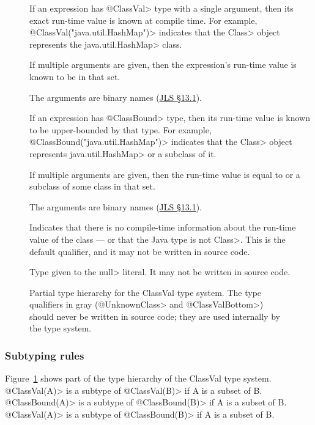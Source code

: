 \begin{description}
\item[]
If an expression has \<@ClassVal> type with a single argument,
then its exact run-time value is known at compile time.
For example, \<@ClassVal({"java.util.HashMap"})>
indicates that the \<Class> object represents the \<java.util.HashMap> class.

If multiple arguments are given, then the expression's run-time value is
known to be in that set.

The arguments are binary names
(\href{https://docs.oracle.com/javase/specs/jls/se8/html/jls-13.html#jls-13.1}{JLS \S 13.1}).

\item[]
If an expression has \<@ClassBound> type, then its run-time value is known
to be upper-bounded by that type.
For example,
\<@ClassBound({"java.util.HashMap"})> indicates that the \<Class> object
represents \<java.util.HashMap> or a subclass of it.

If multiple arguments are given, then the run-time value is equal to or a
subclass of some class in that set.

The arguments are binary names
(\href{https://docs.oracle.com/javase/specs/jls/se8/html/jls-13.html#jls-13.1}{JLS \S 13.1}).

\item[] Indicates that there is no
  compile-time information about the run-time value of the class --- or
  that the Java type is not \<Class>.
  This is the default qualifier, and it may not be written in source code.

\item[] Type given to the \<null> literal.
  It may not be written in source code.
\end{description}
\begin{figure}
\caption{Partial type hierarchy for the ClassVal type system. The type qualifiers in gray (\<@UnknownClass>
and \<@ClassValBottom>) should never be written in source code; they are used internally by the type system.}
\label{fig-classval-hierarchy}
\end{figure}

\subsubsection{Subtyping rules\label{classval-subtyping-rules}}
Figure~\ref{fig-classval-hierarchy} shows part of the type hierarchy of  the
ClassVal type system.
\<@ClassVal(A)> is a subtype of \<@ClassVal(B)> if A is a subset of B.
\<@ClassBound(A)> is a subtype of \<@ClassBound(B)> if A is a subset of B.
\<@ClassVal(A)> is a subtype of \<@ClassBound(B)> if A is a subset of B.


